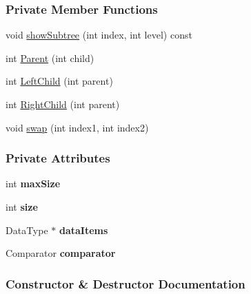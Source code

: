 \subsubsection*{Private Member Functions}
\begin{DoxyCompactItemize}
\item 
void \hyperlink{class_heap_a49a54dd4782e6c68f14a5df3ba4da7af}{show\+Subtree} (int index, int level) const 
\item 
int \hyperlink{class_heap_a85f4db6e6ffa391ad5bebfd26a65fe57}{Parent} (int child)
\item 
int \hyperlink{class_heap_a0b6b9d7ed6c60593064098153d488ae4}{Left\+Child} (int parent)
\item 
int \hyperlink{class_heap_a16a5a9019f1f175f285a0457361cfcf0}{Right\+Child} (int parent)
\item 
void \hyperlink{class_heap_a57a70833393f66b6504efc02676a1ac5}{swap} (int index1, int index2)
\end{DoxyCompactItemize}
\subsubsection*{Private Attributes}
\begin{DoxyCompactItemize}
\item 
int {\bfseries max\+Size}\hypertarget{class_heap_a7f8e5c3cc64b8799b4e75b5a0f675e69}{}\label{class_heap_a7f8e5c3cc64b8799b4e75b5a0f675e69}

\item 
int {\bfseries size}\hypertarget{class_heap_a0964c2d309605bee2f6f1a9cee9ab89a}{}\label{class_heap_a0964c2d309605bee2f6f1a9cee9ab89a}

\item 
Data\+Type $\ast$ {\bfseries data\+Items}\hypertarget{class_heap_ace779ec73409a031eda4a7c1b898eb56}{}\label{class_heap_ace779ec73409a031eda4a7c1b898eb56}

\item 
Comparator {\bfseries comparator}\hypertarget{class_heap_adc20ebd4d97dff37f19ced91ccdc4560}{}\label{class_heap_adc20ebd4d97dff37f19ced91ccdc4560}

\end{DoxyCompactItemize}


\subsubsection{Constructor \& Destructor Documentation}
